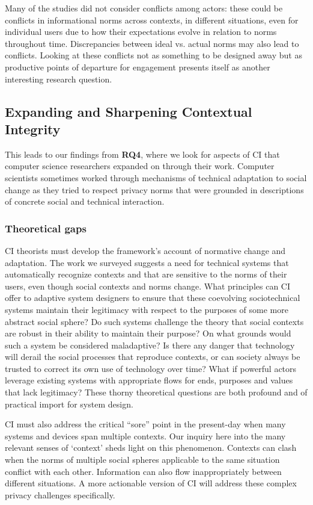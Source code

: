 \documentclass[../thesis.tex]{subfiles}
\begin{document}
Many of the studies did not consider conflicts among actors: these could
be conflicts in informational norms across contexts, in different
situations, even for individual users due to how their expectations
evolve in relation to norms throughout time. Discrepancies between
ideal vs. actual norms may also lead to conflicts. Looking at these
conflicts not as something to be designed away but as productive points
of departure for engagement presents itself as another interesting
research question.

\subsection{Expanding and Sharpening Contextual Integrity}
\label{CI5.4}

This leads to our findings from \textbf{RQ4}, where we look for aspects
of CI that computer science researchers expanded on through their work.
Computer scientists sometimes worked through mechanisms of technical
adaptation to social change as they tried to respect privacy norms that
were grounded in descriptions of concrete social and technical
interaction. 

\subsubsection{Theoretical gaps}
\label{CI5.4.1}

CI theorists must develop the framework's account of
normative change and adaptation. The work we surveyed suggests a need
for technical systems that automatically recognize contexts and that
are sensitive to the norms of their users, even though social contexts
and norms change. What principles can CI offer to adaptive system
designers to ensure that these coevolving sociotechnical systems
maintain their legitimacy with respect to the purposes of some more
abstract social sphere? Do such systems challenge the theory that
social contexts are robust in their ability to maintain their purpose?
On what grounds would such a system be considered maladaptive? Is there
any danger that technology will derail the social processes that
reproduce contexts, or can society always be trusted to correct its own
use of technology over time? What if powerful actors leverage existing
systems with appropriate flows for ends, purposes and values that lack
legitimacy? These thorny theoretical questions are both profound and of
practical import for system design.

CI must also address the critical
``sore'' point in the present-day
when many systems and devices span multiple contexts. Our inquiry here
into the many relevant senses of
`context' sheds light on this
phenomenon. Contexts can clash when the norms of multiple social
spheres applicable to the same situation conflict with each other.
Information can also flow inappropriately between different situations.
A more actionable version of CI will address these complex privacy
challenges specifically.
\end{document}
